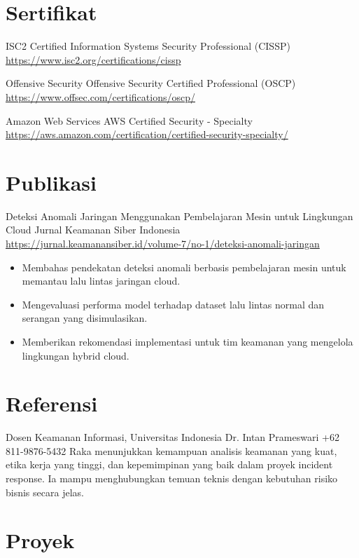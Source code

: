 \documentclass[a4paper, serif, 10pt]{moderncv}
\begin{document}
\section{Sertifikat}

        {ISC2}
        {Certified Information Systems Security Professional (CISSP)}
        {\url{https://www.isc2.org/certifications/cissp}}
        {}
        {}

        {Offensive Security}
        {Offensive Security Certified Professional (OSCP)}
        {\url{https://www.offsec.com/certifications/oscp/}}
        {}
        {}

        {Amazon Web Services}
        {AWS Certified Security - Specialty}
        {\url{https://aws.amazon.com/certification/certified-security-specialty/}}
        {}
        {}
\section{Publikasi}

        {Deteksi Anomali Jaringan Menggunakan Pembelajaran Mesin untuk Lingkungan Cloud}
        {Jurnal Keamanan Siber Indonesia}
        {\url{https://jurnal.keamanansiber.id/volume-7/no-1/deteksi-anomali-jaringan}}
        {}
        {\begin{itemize}
\item Membahas pendekatan deteksi anomali berbasis pembelajaran mesin untuk memantau lalu lintas jaringan cloud.
\item Mengevaluasi performa model terhadap dataset lalu lintas normal dan serangan yang disimulasikan.
\item Memberikan rekomendasi implementasi untuk tim keamanan yang mengelola lingkungan hybrid cloud.
\end{itemize}}
\section{Referensi}

        {Dosen Keamanan Informasi, Universitas Indonesia}
        {Dr. Intan Prameswari}
        {+62 811-9876-5432}
        {}
        {Raka menunjukkan kemampuan analisis keamanan yang kuat, etika kerja yang tinggi, dan kepemimpinan yang baik dalam proyek incident response. Ia mampu menghubungkan temuan teknis dengan kebutuhan risiko bisnis secara jelas.}
\section{Proyek}
\end{document}
